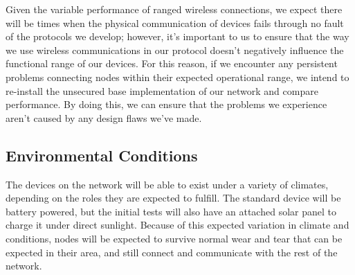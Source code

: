 \documentclass[tikz,a4paper,titlepage]{article}
\begin{document}
Given the variable performance of ranged wireless connections, we expect there will be times when the physical communication of devices fails through no fault of the protocols we develop; however, it's important to us to ensure that the way we use wireless communications in our protocol doesn't negatively influence the functional range of our devices. For this reason, if we encounter any persistent problems connecting nodes within their expected operational range, we intend to re-install the unsecured base implementation of our network and compare performance. By doing this, we can ensure that the problems we experience aren't caused by any design flaws we've made.





    


\subsection{Environmental Conditions} %

The devices on the network will be able to exist under a variety of climates, depending on the roles they are expected to fulfill. The standard device will be battery powered, but the initial tests will also have an attached solar panel to charge it under direct sunlight. Because of this expected variation in climate and conditions, nodes will be expected to survive normal wear and tear that can be expected in their area, and still connect and communicate with the rest of the network.
\end{document}
